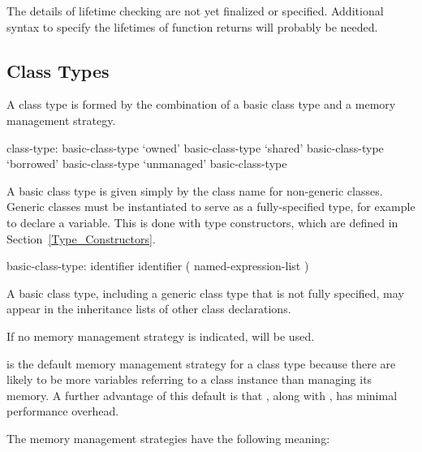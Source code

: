 \begin{future}
  The details of lifetime checking are not yet finalized or specified.
  Additional syntax to specify the lifetimes of function returns will
  probably be needed.
\end{future}

\subsection{Class Types}
\label{Class_Types}

A class type is formed by the combination of a basic class type and a
memory management strategy.

\begin{syntax}
class-type:
  basic-class-type
  `owned' basic-class-type
  `shared' basic-class-type
  `borrowed' basic-class-type
  `unmanaged' basic-class-type
\end{syntax}

A basic class type is given simply by the class name for non-generic classes.
Generic classes must be instantiated to serve as a fully-specified
type, for example to declare a variable.  This is done with
type constructors, which are defined in Section~\ref{Type_Constructors}.

\begin{syntax}
basic-class-type:
  identifier
  identifier ( named-expression-list )
\end{syntax}

A basic class type, including a generic class type that is not
fully specified, may appear in the inheritance lists
of other class declarations.

If no memory management strategy is indicated,  will be
used.

\begin{rationale}
   is the default memory management strategy for a class
  type because there are likely to be more variables referring to a class
  instance than managing its memory. A further advantage of this default
  is that , along with , has minimal
  performance overhead.
\end{rationale}

The memory management strategies have the following meaning:

